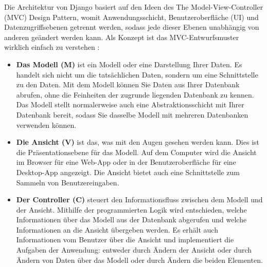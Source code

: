 Die Architektur von Django basiert auf den Ideen des The Model-View-Controller (MVC) Design Pattern, womit Anwendungsschicht, Benutzeroberfläche (UI) und Datenzugriffsebenen getrennt werden, sodass jede dieser Ebenen unabhängig von anderen geändert werden kann. Als Konzept ist das MVC-Entwurfsmuster wirklich einfach zu verstehen \cite[pp. 15-16]{george:django}:
\begin{itemize}
	\item \textbf{Das Modell (M)} ist ein Modell oder eine Darstellung Ihrer Daten. Es handelt sich nicht um die tatsächlichen Daten, sondern um eine Schnittstelle zu den Daten. Mit dem Modell können Sie Daten aus Ihrer Datenbank abrufen, ohne die Feinheiten der zugrunde liegenden Datenbank zu kennen. Das Modell stellt normalerweise auch eine Abstraktionsschicht mit Ihrer Datenbank bereit, sodass Sie dasselbe Modell mit mehreren Datenbanken verwenden können.
	\item \textbf{Die Ansicht (V)} ist das, was mit den Augen gesehen werden kann. Dies ist die Präsentationsebene für das Modell. Auf dem Computer wird die Ansicht im Browser für eine Web-App oder in der Benutzeroberfläche für eine Desktop-App angezeigt. Die Ansicht bietet auch eine Schnittstelle zum Sammeln von Benutzereingaben.
	\item \textbf{Der Controller (C)} steuert den Informationsfluss zwischen dem Modell und der Ansicht. Mithilfe der programmierten Logik wird entschieden, welche Informationen über das Modell aus der Datenbank abgerufen und welche Informationen an die Ansicht übergeben werden. Es erhält auch Informationen vom Benutzer über die Ansicht und implementiert die Aufgaben der Anwendung: entweder durch Ändern der Ansicht oder durch Ändern von Daten über das Modell oder durch Ändern die beiden Elementen.
\end{itemize}

